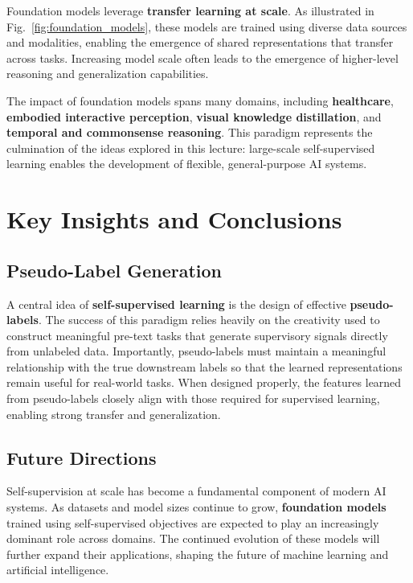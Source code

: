 \documentclass{article}
\begin{document}
Foundation models leverage \textbf{transfer learning at scale}. As illustrated in Fig.~\ref{fig:foundation_models}, these models are trained using diverse data sources and modalities, enabling the emergence of shared representations that transfer across tasks. Increasing model scale often leads to the emergence of higher-level reasoning and generalization capabilities.

The impact of foundation models spans many domains, including \textbf{healthcare}, \textbf{embodied interactive perception}, \textbf{visual knowledge distillation}, and \textbf{temporal and commonsense reasoning}. This paradigm represents the culmination of the ideas explored in this lecture: large-scale self-supervised learning enables the development of flexible, general-purpose AI systems.

\section{Key Insights and Conclusions}

\subsection{Pseudo-Label Generation}

A central idea of \textbf{self-supervised learning} is the design of effective \textbf{pseudo-labels}. The success of this paradigm relies heavily on the creativity used to construct meaningful pre-text tasks that generate supervisory signals directly from unlabeled data. Importantly, pseudo-labels must maintain a meaningful relationship with the true downstream labels so that the learned representations remain useful for real-world tasks. When designed properly, the features learned from pseudo-labels closely align with those required for supervised learning, enabling strong transfer and generalization.

\subsection{Future Directions}

Self-supervision at scale has become a fundamental component of modern AI systems. As datasets and model sizes continue to grow, \textbf{foundation models} trained using self-supervised objectives are expected to play an increasingly dominant role across domains. The continued evolution of these models will further expand their applications, shaping the future of machine learning and artificial intelligence.
\end{document}
